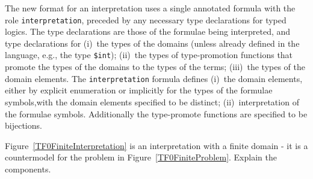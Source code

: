 \documentclass[letterpaper]{article}
\newcommand{\smalltt}[1]{\small \texttt{#1}}
\begin{document}
The new format for an interpretation uses a single annotated formula with the role 
\smalltt{interpretation}, preceded by any necessary type declarations for typed logics.
The type declarations are those of the formulae being interpreted, and type declarations for
(i)~the types of the domains (unless already defined in the language, e.g., the type
\smalltt{\$int});
(ii)~the types of type-promotion functions that promote the types of the domains to 
the types of the terms;
(iii)~the types of the domain elements.
The \smalltt{interpretation} formula defines 
(i)~the domain elements, either by explicit enumeration or implicitly for the types of the 
formulae symbols,with the domain elements specified to be distinct; 
(ii)~interpretation of the formulae symbols.
Additionally the type-promote functions are specified to be bijections.

Figure~\ref{TF0FiniteInterpretation} is an interpretation with a finite domain - it is a 
countermodel for the problem in Figure~\ref{TF0FiniteProblem}.
Explain the components.
\end{document}
